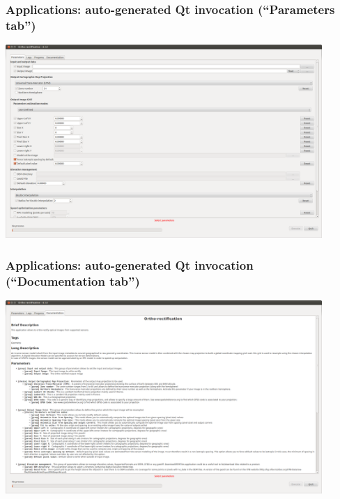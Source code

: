 \documentclass[8pt]{beamer}
\begin{document}
\begin{frame}[fragile]
\frametitle{Applications: auto-generated Qt invocation (``Parameters tab'')}
\begin{center}
\includegraphics[width=0.9\textwidth]{images/app_parameters.png}
\end{center}
\end{frame}


\begin{frame}[fragile]
\frametitle{Applications: auto-generated Qt invocation (``Documentation tab'')}
\begin{center}
\includegraphics[width=0.9\textwidth]{images/app_doc.png}
\end{center}
\end{frame}
\end{document}
